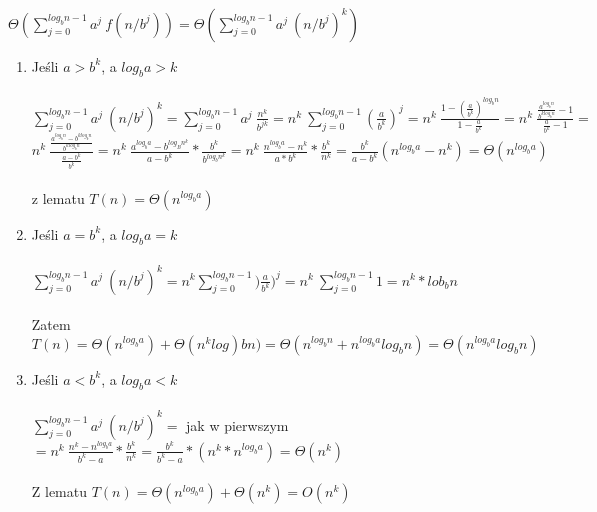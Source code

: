 \\
$\Theta(\sum_{j=0}^{log_bn-1} a^j\ f(n/b^j))=\Theta(\sum_{j=0}^{log_bn-1} a^j\ (n/b^j)^k)$\\
\begin{enumerate}
\item Jeśli $a>b^k$, a $log_ba>k$\\
	\\
	$\sum_{j=0}^{log_bn-1} a^j\ (n/b^j)^k = \sum_{j=0}^{log_bn-1} a^j\ \frac{n^k}{b^{jk}}=n^k\ \sum_{j=0}^{log_bn-1} (\frac{a}{b^k})^j = n^k\ \frac{1-(\frac{a}{b^k})^{log_bn}}{1-\frac{a}{b^k}}= n^k\ \frac{\frac{a^{log_bn}}{b^{klog_bn}}-1}{\frac{a}{b^k}-1}=$\\
	$n^k\ \frac{\frac{a^{log_bn}-b^{klog_bn}}{b^{klog_bn}}}{\frac{a-b^k}{b^k}}= n^k\ \frac{a^{log_ba}-b^{log_Bn^k}}{a-b^k} \ast \frac{b^k}{b^{log_bn^k}}= n^k\ \frac{n^{log_ba}-n^k}{a\ast b^k}\ast \frac{b^k}{n^k} = \frac{b^k}{a-b^k}(n^{log_ba}-n^k) = \Theta(n^{log_ba})$\\
	\\
	z lematu $T(n) = \Theta(n^{log_ba})$
\item Jeśli $a=b^k$, a $log_ba=k$\\
	\\
	$\sum_{j=0}^{log_bn-1} a^j\ (n/b^j)^k = n^k\sum_{j=0}^{log_bn-1} )\frac{a}{b^k})^j = n^k\ \sum_{j=0}^{log_bn-1} 1 = n^k \ast lob_bn$\\
	\\
	Zatem $T(n) = \Theta(n^{log_ba}) + \Theta(n^klog)bn) = \Theta(n^{log_bn} + n^{log_ba}log_bn) = \Theta(n^{log_ba}log_bn)$
\item Jeśli $a<b^k$, a $log_ba<k$\\
	\\
	$\sum_{j=0}^{log_bn-1} a^j\ (n/b^j)^k = $ jak w pierwszym $ = n^k\ \frac{n^k-n^{log_ba}}{b^k-a} \ast \frac{b^k}{n^k} = \frac{b^k}{b^k-a}\ast (n^k \ast n^{log_ba})=\Theta(n^k)$\\
	\\
	Z lematu $T(n) = \Theta(n^{log_ba}) + \Theta(n^k) = O(n^k)$
\end{enumerate}

